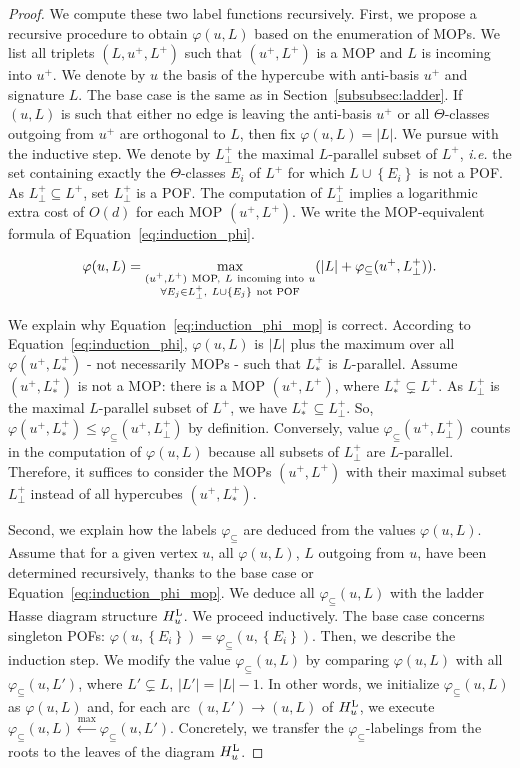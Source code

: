 \documentclass[a4paper,UKenglish,numberwithinsect,cleveref, autoref]{lipics-v2021}
\newcommand{\set}[1]{\left\{ #1 \right\}}
\newcommand{\card}[1]{\left| #1 \right|}
\newcommand{\hul}{H_u^{\mbox{\scriptsize{L}}}}
\newcommand{\varphis}{\varphi_{\subseteq}}
\begin{document}
\begin{proof}
We compute these two label functions recursively. First, we propose a recursive procedure to obtain $\varphi(u,L)$ based on the enumeration of MOPs. We list all triplets $(L,u^+,L^+)$ such that $(u^+,L^+)$ is a MOP and $L$ is incoming into $u^+$. We denote by $u$ the basis of the hypercube with anti-basis $u^+$ and signature $L$. 
The base case is the same as in Section~\ref{subsubsec:ladder}. If $(u,L)$ is such that either no edge is leaving the anti-basis $u^+$ or all $\Theta$-classes outgoing from $u^+$ are orthogonal to $L$, then fix $\varphi(u,L) = \card{L}$. 
We pursue with the inductive step. We denote by $L_{\perp}^+$ the maximal $L$-parallel subset of $L^+$, {\em i.e.} the set containing exactly the $\Theta$-classes $E_i$ of $L^+$ for which $L \cup \set{E_i}$ is not a POF. As $L_{\perp}^+ \subseteq L^+$, set $L_{\perp}^+$ is a POF. The computation of $L_{\perp}^+$ implies a logarithmic extra cost of $O(d)$ for each MOP $(u^+,L^+)$. We write the MOP-equivalent formula of Equation~\eqref{eq:induction_phi}.

\begin{equation}
     \varphi(u,L) = \max\limits_{\substack{(u^+,L^+) ~\mbox{\scriptsize{MOP,}}~ L ~\mbox{\scriptsize{incoming into}}~ u  \\ \forall E_j \in L_{\perp}^+,~ L \cup \set{E_j} ~\mbox{\scriptsize{not POF}}}} (\card{L} + \varphis(u^+,L_{\perp}^+)).
    \label{eq:induction_phi_mop}
\end{equation}

We explain why Equation~\eqref{eq:induction_phi_mop} is correct. According to Equation~\eqref{eq:induction_phi}, $\varphi(u,L)$ is $\card{L}$ plus the maximum over all $\varphi(u^+,L_*^+)$ - not necessarily MOPs - such that $L_*^+$ is $L$-parallel. Assume $(u^+,L_*^+)$ is not a MOP: there is a MOP $(u^+,L^+)$, where $L_*^+ \subsetneq L^+$. As $L_{\perp}^+$ is the maximal $L$-parallel subset of $L^+$, we have $L_*^+ \subseteq L_{\perp}^+$. So, $\varphi(u^+,L_*^+) \le \varphis(u^+,L_{\perp}^+)$ by definition. Conversely, value $\varphis(u^+,L_{\perp}^+)$ counts in the computation of $\varphi(u,L)$ because all subsets of $L_{\perp}^+$ are $L$-parallel. Therefore, it suffices to consider the MOPs $(u^+,L^+)$ with their maximal subset $L_{\perp}^+$ instead of all hypercubes $(u^+,L_*^+)$.

Second, we explain how the labels $\varphis$ are deduced from the values $\varphi(u,L)$. Assume that for a given vertex $u$, all $\varphi(u,L)$, $L$ outgoing from $u$, have been determined recursively, thanks to the base case or Equation~\eqref{eq:induction_phi_mop}. We deduce all $\varphis(u,L)$ with the ladder Hasse diagram structure $\hul$. We proceed inductively. The base case concerns singleton POFs: $\varphi(u,\set{E_i}) = \varphis(u,\set{E_i})$. Then, we describe the induction step. We modify the value $\varphis(u,L)$ by comparing $\varphi(u,L)$ with all $\varphis(u,L')$, where $L' \subsetneq L$, $\card{L'} = \card{L} -1$. In other words, we initialize $\varphis(u,L)$ as $\varphi(u,L)$ and, for each arc $(u,L')\rightarrow (u,L)$ of $\hul$, we execute $\varphis(u,L) \xleftarrow{\max} \varphis(u,L')$. Concretely, we transfer the $\varphis$-labelings from the roots to the leaves of the diagram $\hul$.


\end{proof}
\end{document}
